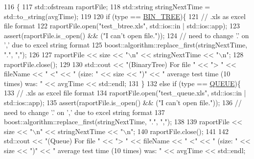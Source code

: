 \begin{DoxyCode}
116                                                                                                \{
117     std::ofstream raportFile;
118     std::string stringNextTime = std::to\_string(avgTime);
119 
120     \textcolor{keywordflow}{if} (type == \hyperlink{benchmark__frm_8h_ac2ad7f431e3446fddcd9b6b9f93c4c14ae7f0b7f228990e5b8ce4a9541f26c062}{BIN\_TREE})\{
121         \textcolor{comment}{// .xls as excel file format}
122         raportFile.open(\textcolor{stringliteral}{"test\_btree.xls"}, std::ios::in | std::ios::app);
123         assert(raportFile.is\_open() && (\textcolor{stringliteral}{"I can't open file."}));
124         \textcolor{comment}{// need to change '.' on ',' due to excel string format }
125         boost::algorithm::replace\_first(stringNextTime, \textcolor{stringliteral}{"."}, \textcolor{stringliteral}{","});
126 
127         raportFile << size << \textcolor{stringliteral}{"\(\backslash\)n"} << stringNextTime << \textcolor{stringliteral}{"\(\backslash\)n"};
128         raportFile.close();
129 
130         std::cout << \textcolor{stringliteral}{"(BinaryTree) For file "} << \textcolor{stringliteral}{"> "} << fileName << \textcolor{stringliteral}{" <"} << \textcolor{stringliteral}{" (size: "} << size << \textcolor{stringliteral}{")"} << \textcolor{stringliteral}{"
       average test time (10 times) was: "} << avgTime << std::endl;
131     \}
132     \textcolor{keywordflow}{else} \textcolor{keywordflow}{if} (type == \hyperlink{benchmark__frm_8h_ac2ad7f431e3446fddcd9b6b9f93c4c14a15daaafacaefff3b690c1c2669ef0caa}{QUEUE})\{
133         \textcolor{comment}{// .xls as excel file format}
134         raportFile.open(\textcolor{stringliteral}{"test\_queue.xls"}, std::ios::in | std::ios::app);
135         assert(raportFile.is\_open() && (\textcolor{stringliteral}{"I can't open file."}));
136         \textcolor{comment}{// need to change '.' on ',' due to excel string format }
137         boost::algorithm::replace\_first(stringNextTime, \textcolor{stringliteral}{"."}, \textcolor{stringliteral}{","});
138 
139         raportFile << size << \textcolor{stringliteral}{"\(\backslash\)n"} << stringNextTime << \textcolor{stringliteral}{"\(\backslash\)n"};
140         raportFile.close();
141 
142         std::cout << \textcolor{stringliteral}{"(Queue) For file "} << \textcolor{stringliteral}{"> "} << fileName << \textcolor{stringliteral}{" <"} << \textcolor{stringliteral}{" (size: "} << size << \textcolor{stringliteral}{")"} << \textcolor{stringliteral}{"
       average test time (10 times) was: "} << avgTime << std::endl;

\end{DoxyCode}
